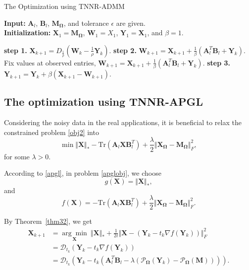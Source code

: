 \documentclass{article}
\begin{document}
{\begin{algorithm}[t]
    \caption{The Optimization using TNNR-ADMM}
    \label{algo2}
    \textbf{Input:} $\mathbf A_l$, $\mathbf B_l$, $\mathbf M_{\mathbf\Omega}$, and tolerance $\epsilon$ are given.\\
    \textbf{Initialization:} $\mathbf X_1 = \mathbf M_{\mathbf\Omega}$, $\mathbf W_1 = X_1$, $\mathbf Y_1=\mathbf X_1$, and $\beta = 1$. 
    \begin{algorithmic}
        \Repeat 
        \State \textbf{step 1.} $\mathbf X_{k+1} = D_{\frac{1}{\rho}}(\mathbf W_k - \frac{1}{\rho}\mathbf Y_k)$.
        \State \textbf{step 2.} $\mathbf W_{k+1} = \mathbf X_{k+1} + \frac{1}{\beta}(\mathbf A_l^T\mathbf B_l + \mathbf Y_k)$.
        \State Fix values at observed entries, 
        $\mathbf W_{k+1} = \mathbf X_{k+1} + \frac{1}{\beta}(\mathbf A_l^T\mathbf B_l + \mathbf Y_k)$.
        \State \textbf{step 3.} $\mathbf Y_{k+1} = \mathbf Y_{k} + \beta(\mathbf X_{k+1} -\mathbf W_{k+1})$.
    \end{algorithmic}
\end{algorithm}

\subsection{The optimization using TNNR-APGL}
Considering the noisy data in the real applications, it is beneficial to relax the constrained problem \eqref{obj2} into
\begin{equation}
    \min \Vert\mathbf X \Vert_* - \text{Tr}(\mathbf A_l\mathbf X\mathbf B_l^T) + \frac{\lambda}{2}\Vert\mathbf X_{\mathbf\Omega} -\mathbf M_{\mathbf\Omega} \Vert^2_F,
    \label{apglobj}
\end{equation}
for some $\lambda >0$.

According to \eqref{apgl}, in problem \eqref{apglobj}, we choose
\begin{equation*}
    g(\mathbf X) = \Vert\mathbf X \Vert_*,
\end{equation*}
and
\begin{equation*}
    f(\mathbf X) = - \text{Tr}(\mathbf A_l\mathbf X\mathbf B_l^T) + \frac{\lambda}{2}\Vert\mathbf X_{\mathbf\Omega} -\mathbf M_{\mathbf\Omega} \Vert^2_F.
\end{equation*}

By Theorem~\ref{thm32}, we get
\begin{equation}
    \begin{aligned}
        \mathbf X_{k+1} & = \underset{\mathbf X}{\arg\min}\  \Vert\mathbf X \Vert_* + \frac{1}{2t}\Vert\mathbf X- (\mathbf Y_k -t_k \nabla f(\mathbf Y_k))\Vert_F^2 \\
        & = \mathcal{D}_{t_k}(\mathbf Y_k - t_k\nabla f(\mathbf Y_k)) \\
        & = \mathcal{D}_{t_k}(\mathbf Y_k - t_k(\mathbf A_l^T\mathbf B_l - \lambda(\mathcal{P}_{\mathbf\Omega}(\mathbf Y_k)- \mathcal{P}_{\mathbf\Omega}(\mathbf M)))).
    \end{aligned}
\end{equation}

}
\end{document}
